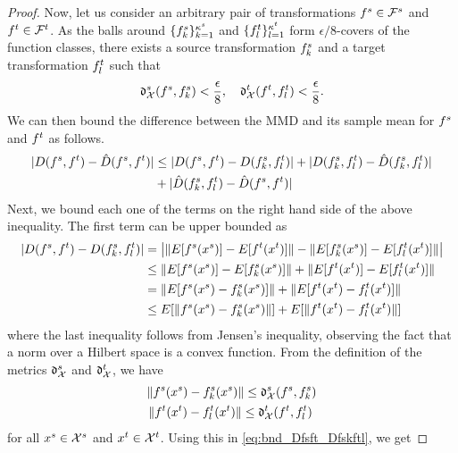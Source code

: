 \documentclass[review,supplement,onefignum,onetabnum]{siamonline250211}
\begin{document}
\begin{proof}
Now, let us consider an arbitrary pair of transformations $f^s \in \mathcal{F}^s$ and $f^t \in \mathcal{F}^t$. As the balls around $\{ f^s_k \}_{k=1}^{\kappa^s}$ and $\{ f^t_l \}_{l=1}^{\kappa^t}$ form $\epsilon/8$-covers of the function classes, there exists a source transformation $f^s_k$ and a target transformation $f^t_l$ such that
%
\begin{equation*}
\mathfrak{d}^s_{\mathcal{X}}  (f^s, f^s_k) < \frac{ \epsilon}{8},
\quad
\mathfrak{d}^t_{\mathcal{X}}  (f^t, f^t_l) < \frac{ \epsilon}{8}.
\end{equation*}
%
We can then bound the difference between the MMD and its sample mean for $f^s$ and $f^t$ as follows.
%
\begin{equation}
\label{eq:form_D_Dhat_fs_ft}
\begin{split}
| D(f^s, f^t) - \hat{D}(f^s, f^t) |
&\leq  | D(f^s, f^t) - D(f^s_k, f^t_l) |
    + | D(f^s_k, f^t_l) - \hat{D}(f^s_k, f^t_l) | \\
    &+  | \hat{D}(f^s_k, f^t_l) - \hat{D}(f^s, f^t) | 
\end{split}
\end{equation}
%
Next, we bound each one of the terms on the right hand side of the above inequality. The first term can be upper bounded as
%
\begin{equation}
\label{eq:bnd_Dfsft_Dfskftl}
\begin{split}
| D(f^s, f^t) - D(f^s_k, f^t_l) | 
&=
\left | 
\|  
E[f^s(x^s)] - E[f^t(x^t)]
    \|
    - 
    \|  
E[f^s_k(x^s)] - E[f^t_l(x^t)]
    \|
\right | \\
&\leq
\|
E[f^s(x^s)] - E[f^s_k(x^s)] 
\|
+
\|
E[f^t(x^t)] - E[f^t_l(x^t)] 
\| \\
&=
\|
E[f^s(x^s)  - f^s_k(x^s)] 
\|
+
\|
E[f^t(x^t)  - f^t_l(x^t)] 
\| \\
& \leq
E[ \| f^s(x^s)  - f^s_k(x^s)  \| ] 
+ E[ \| f^t(x^t)  - f^t_l(x^t) \| ] 
\end{split}
\end{equation}
%
where the last inequality follows from Jensen's inequality, observing the fact that a norm over a Hilbert space is a convex function. From the definition of the metrics $\mathfrak{d}^s_{\mathcal{X}} $ and $\mathfrak{d}^t_{\mathcal{X}} $, we have 
%
\begin{equation*}
\begin{split}
\| f^s(x^s)  - f^s_k(x^s)  \|  \leq \mathfrak{d}^s_{\mathcal{X}} (f^s, f^s_k) \\
\| f^t(x^t)  - f^t_l(x^t)  \|  \leq \mathfrak{d}^t_{\mathcal{X}} (f^t, f^t_l) \
\end{split}
\end{equation*}
% 
for all $x^s \in \mathcal{X}^s$ and $x^t \in \mathcal{X}^t$. Using this in \eqref{eq:bnd_Dfsft_Dfskftl}, we get

\end{proof}
\end{document}
